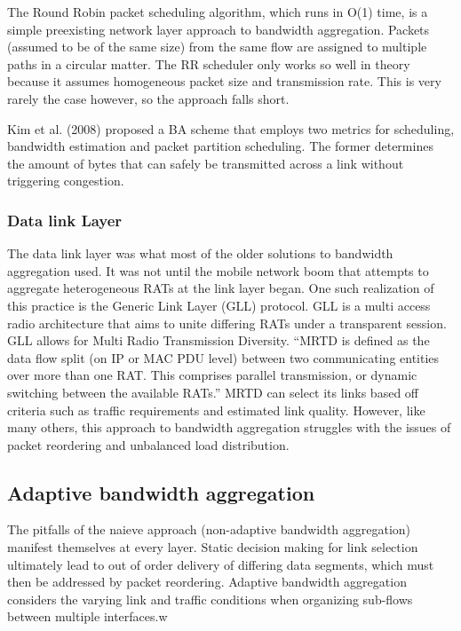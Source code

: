 \documentclass[12pt]{article}
\begin{document}
			The Round Robin packet scheduling algorithm, which runs in O(1) time, is a simple preexisting network layer approach to bandwidth aggregation. Packets (assumed to be of the same size) from the same flow are assigned to multiple paths in a circular matter. The RR scheduler only works so well in theory because it assumes homogeneous packet size and transmission rate. This is very rarely the case however, so the approach falls short.

			Kim et al. (2008) proposed a BA scheme that employs two metrics for scheduling, bandwidth estimation and packet partition scheduling. The former determines the amount of bytes that can safely be transmitted across a link without triggering congestion. 

		\subsubsection{Data link Layer}
			The data link layer was what most of the older solutions to bandwidth aggregation used. It was not until the mobile network boom that attempts to aggregate heterogeneous RATs at the link layer began. One such realization of this practice is the Generic Link Layer (GLL) protocol. GLL is a multi access radio architecture that aims to unite differing RATs under a transparent session. GLL allows for Multi Radio Transmission Diversity.
			 ``MRTD is defined as the data flow split (on IP or MAC PDU level) between two communicating entities over more than one RAT. This comprises parallel transmission, or dynamic switching between the available RATs.''\cite{GLL:2005}
			MRTD can select its links based off criteria such as traffic requirements and estimated link quality. However, like many others, this approach to bandwidth aggregation struggles with the issues of packet reordering and unbalanced load distribution.

	\subsection{Adaptive bandwidth aggregation}
		The pitfalls of the naieve approach (non-adaptive bandwidth aggregation) manifest themselves at every layer. Static decision making for link selection ultimately lead to out of order delivery of differing data segments, which must then be addressed by packet reordering. 
		Adaptive bandwidth aggregation considers the varying link and traffic conditions when organizing sub-flows between multiple interfaces.w
\end{document}
